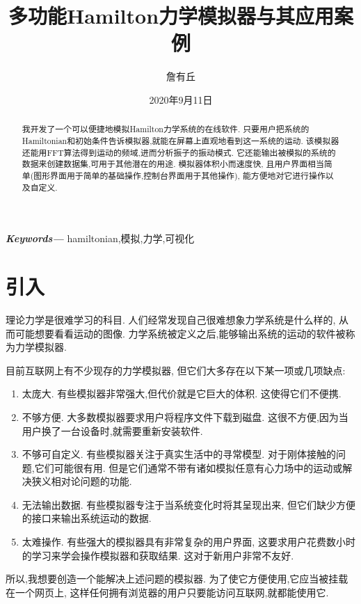 \documentclass[12pt]{article}
\date{2020年9月11日}
\title{多功能Hamilton力学模拟器与其应用案例}
\author{詹有丘}
\providecommand{\keywords}[1]{\small\textbf{\textit{Keywords---}} #1}
\begin{document}
\maketitle

\begin{abstract}
我开发了一个可以便捷地模拟Hamilton力学系统的在线软件.
只要用户把系统的Hamiltonian和初始条件告诉模拟器,就能在屏幕上直观地看到这一系统的运动.
该模拟器还能用FFT算法得到运动的频域,进而分析振子的振动模式.
它还能输出被模拟的系统的数据来创建数据集,可用于其他潜在的用途.
模拟器体积小而速度快,
且用户界面相当简单(图形界面用于简单的基础操作,控制台界面用于其他操作),
能方便地对它进行操作以及自定义.
\end{abstract}

\keywords{hamiltonian,模拟,力学,可视化}

\tableofcontents

\section{引入}
\label{sec:intro}

理论力学是很难学习的科目.
人们经常发现自己很难想象力学系统是什么样的,
从而可能想要看看运动的图像.
力学系统被定义之后,能够输出系统的运动的软件被称为力学模拟器.

目前互联网上有不少现存的力学模拟器,
但它们大多存在以下某一项或几项缺点:
\begin{enumerate}
  \item 太庞大.
  有些模拟器非常强大,但代价就是它巨大的体积.
  这使得它们不便携.

  \item 不够方便.
  大多数模拟器要求用户将程序文件下载到磁盘.
  这很不方便,因为当用户换了一台设备时,就需要重新安装软件.

  \item 不够可自定义.
  有些模拟器关注于真实生活中的寻常模型.
  对于刚体接触的问题,它们可能很有用.
  但是它们通常不带有诸如模拟任意有心力场中的运动或解决狭义相对论问题的功能.

  \item 无法输出数据.
  有些模拟器专注于当系统变化时将其呈现出来,
  但它们缺少方便的接口来输出系统运动的数据.

  \item 太难操作.
  有些强大的模拟器具有非常复杂的用户界面,
  这要求用户花费数小时的学习来学会操作模拟器和获取结果.
  这对于新用户非常不友好.
\end{enumerate}

所以,我想要创造一个能解决上述问题的模拟器.
为了使它方便使用,它应当被挂载在一个网页上,
这样任何拥有浏览器的用户只要能访问互联网,就都能使用它.
\end{document}
